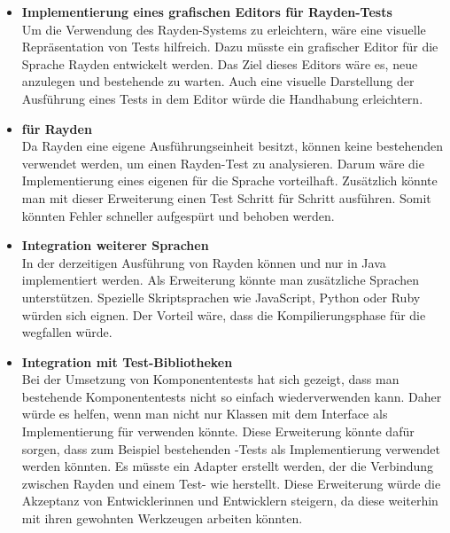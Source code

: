 \begin{itemize}
\item \textbf{Implementierung eines grafischen Editors für Rayden-Tests}\\
Um die Verwendung des Rayden-Systems zu erleichtern, wäre eine visuelle Repräsentation von Tests hilfreich. Dazu müsste ein grafischer Editor für die Sprache Rayden entwickelt werden. Das Ziel dieses Editors wäre es, neue  anzulegen und bestehende zu warten. Auch eine visuelle Darstellung der Ausführung eines Tests in dem Editor würde die Handhabung erleichtern.\\

\item \textbf{ für Rayden}\\
Da Rayden eine eigene Ausführungseinheit besitzt, können keine bestehenden  verwendet werden, um einen Rayden-Test zu analysieren. Darum wäre die Implementierung eines eigenen  für die Sprache vorteilhaft. Zusätzlich könnte man mit dieser Erweiterung einen Test Schritt für Schritt ausführen. Somit könnten Fehler schneller aufgespürt und behoben werden.\\

\item \textbf{Integration weiterer Sprachen}\\
In der derzeitigen Ausführung von Rayden können  und  nur in Java implementiert werden. Als Erweiterung könnte man zusätzliche Sprachen unterstützen. Spezielle Skriptsprachen wie JavaScript, Python oder Ruby würden sich eignen. Der Vorteil wäre, dass die Kompilierungsphase für die  wegfallen würde. \\

\item \textbf{Integration mit Test-Bibliotheken}\\
Bei der Umsetzung von Komponententests hat sich gezeigt, dass man bestehende Komponententests nicht so einfach wiederverwenden kann. Daher würde es helfen, wenn man nicht nur Klassen mit dem Interface  als Implementierung für  verwenden könnte. Diese Erweiterung könnte dafür sorgen, dass zum Beispiel bestehenden -Tests als Implementierung verwendet werden könnten. Es müsste ein Adapter erstellt werden, der die Verbindung zwischen Rayden und einem Test- wie  herstellt. Diese Erweiterung würde die Akzeptanz von Entwicklerinnen und Entwicklern steigern, da diese weiterhin mit ihren gewohnten Werkzeugen arbeiten könnten. 

\end{itemize}

